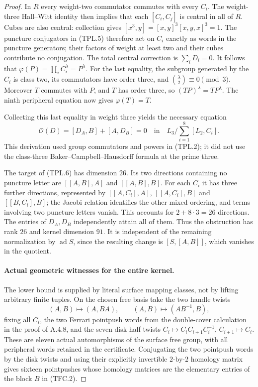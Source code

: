 \begin{proof}
In $R$ every weight-two commutator commutes with every $C_i$.
The weight-three Hall--Witt identity then implies that each
$[C_i,C_j]$ is central in all of $R$.
Cubes are also central: collection gives
$[x^3,y]=[x,y]^3[x,y,x]^3=1$.
The puncture conjugators in (TPL.5) therefore act on $C_i$
exactly as words in the puncture generators; their factors of
weight at least two and their cubes contribute no conjugation.
The total central correction is $\sum_iD_i=0$.
It follows that
$\varphi(P)=\prod_iC_i^\lambda=P^\lambda$.
For the last equality, the subgroup generated by the $C_i$ is
class two, its commutators have order three, and
$\binom{\lambda}{2}\equiv0\pmod3$.
Moreover $T$ commutes with $P$, and $T$ has order three, so
$(TP)^\lambda=T P^\lambda$.
The ninth peripheral equation now gives $\varphi(T)=T$.

Collecting this last equality in weight three yields the
necessary equation
\[
 \mathcal O(D)=[D_A,B]+[A,D_B]=0
 \quad\text{in}\quad
 L_3\big/\sum_{i=1}^8[L_2,C_i].                       \tag{TPL.6}
\]
This derivation used group commutators and powers in (TPL.2);
it did not use the class-three Baker--Campbell--Hausdorff
formula at the prime three.

The target of (TPL.6) has dimension $26$.
Its two directions containing no puncture letter are
$[[A,B],A]$ and $[[A,B],B]$.
For each $C_i$ it has three further directions, represented
by $[[A,C_i],A]$, $[[A,C_i],B]$ and
$[[B,C_i],B]$; the Jacobi relation identifies the other mixed
ordering, and terms involving two puncture letters vanish.
This accounts for $2+8\cdot3=26$ directions.
The entries of $D_A,D_B$ independently attain all of them.
Thus the obstruction has rank $26$ and kernel dimension $91$.
It is independent of the remaining normalization by
$\operatorname{ad}S$, since the resulting change is
$[S,[A,B]]$, which vanishes in the quotient.

\paragraph{Actual geometric witnesses for the entire kernel.}
The lower bound is supplied by literal surface mapping classes,
not by lifting arbitrary finite tuples.  On the chosen free
basis take the two handle twists
\[
 (A,B)\longmapsto(A,BA),\qquad
 (A,B)\longmapsto(AB^{-1},B),                          \tag{TPL.7}
\]
fixing all $C_i$, the two Ferrari pointpush words from the
double-cover calculation in the proof of A.4.8, and the seven
disk half twists
$C_i\mapsto C_iC_{i+1}C_i^{-1}$,
$C_{i+1}\mapsto C_i$.
These are eleven actual automorphisms of the surface free
group, with all peripheral words retained in the certificate.
Conjugating the two pointpush words by the disk twists and
using their explicitly invertible $2$-by-$2$ homology matrix
gives sixteen pointpushes whose homology matrices are the
elementary entries of the block $B$ in (TFC.2).


\end{proof}
